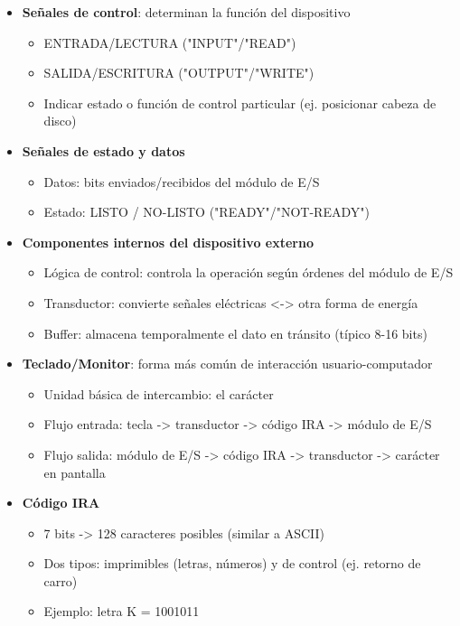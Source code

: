 \documentclass{article}
\begin{document}
\begin{itemize}
\begin{itemize}
\begin{enumerate}
\item De comunicación (dispositivos remotos)
\end{enumerate}
\end{itemize}
\item \textbf{Señales de control}: determinan la función del dispositivo
\begin{itemize}
\item ENTRADA/LECTURA ("INPUT"/"READ")
\item SALIDA/ESCRITURA ("OUTPUT"/"WRITE")
\item Indicar estado o función de control particular (ej. posicionar cabeza de disco)
\end{itemize}
\item \textbf{Señales de estado y datos}
\begin{itemize}
\item Datos: bits enviados/recibidos del módulo de E/S
\item Estado: LISTO / NO-LISTO ("READY"/"NOT-READY")
\end{itemize}
\item \textbf{Componentes internos del dispositivo externo}
\begin{itemize}
\item Lógica de control: controla la operación según órdenes del módulo de E/S
\item Transductor: convierte señales eléctricas <-> otra forma de energía
\item Buffer: almacena temporalmente el dato en tránsito (típico 8-16 bits)
\end{itemize}
\item \textbf{Teclado/Monitor}: forma más común de interacción usuario-computador
\begin{itemize}
\item Unidad básica de intercambio: el carácter
\item Flujo entrada: tecla -> transductor -> código IRA -> módulo de E/S
\item Flujo salida: módulo de E/S -> código IRA -> transductor -> carácter en pantalla
\end{itemize}
\item \textbf{Código IRA}
\begin{itemize}
\item 7 bits -> 128 caracteres posibles (similar a ASCII)
\item Dos tipos: imprimibles (letras, números) y de control (ej. retorno de carro)
\item Ejemplo: letra K = 1001011

\end{itemize}
\end{itemize}
\end{document}

